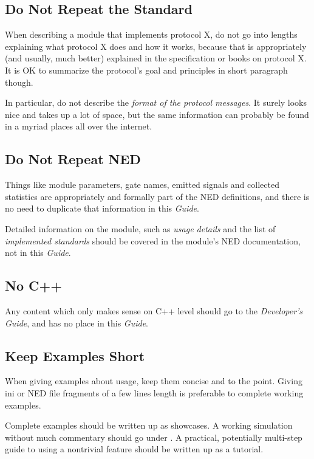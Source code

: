 \subsection{Do Not Repeat the Standard}

When describing a module that implements protocol X, do not go
into lengths explaining what protocol X does and how it works,
because that is appropriately (and usually, much better) explained 
in the specification or books on protocol X. It is OK to summarize
the protocol's goal and principles in short paragraph though.

In particular, do not describe the \textit{format of the protocol messages}.
It surely looks nice and takes up a lot of space, but the same information
can probably be found in a myriad places all over the internet.

\subsection{Do Not Repeat NED}

Things like module parameters, gate names, emitted signals and collected 
statistics are appropriately and formally part of the NED definitions,
and there is no need to duplicate that information in this \textit{Guide}.

Detailed information on the module, such as \textit{usage details} and the 
list of \textit{implemented standards} should be covered in the module's 
NED documentation, not in this \textit{Guide}.

\subsection{No C++}

Any content which only makes sense on C++ level should go to the
\textit{Developer's Guide}, and has no place in this \textit{Guide}. 

\subsection{Keep Examples Short}

When giving examples about usage, keep them concise and to the point.
Giving ini or NED file fragments of a few lines length is preferable
to complete working examples.

Complete examples should be written up as showcases. A working simulation
without much commentary should go under . A practical, 
potentially multi-step guide to using a nontrivial feature should be
written up as a tutorial.

